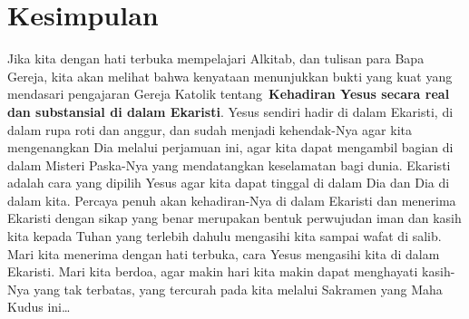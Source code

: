 \section[Kesimpulan]{Kesimpulan}
Jika kita dengan hati terbuka mempelajari Alkitab, dan tulisan para Bapa
Gereja, kita akan melihat bahwa kenyataan menunjukkan bukti yang kuat
yang mendasari pengajaran Gereja Katolik tentang~\textbf{Kehadiran
Yesus secara real dan substansial di dalam Ekaristi}. Yesus sendiri
hadir di dalam Ekaristi, di dalam rupa roti dan anggur, dan sudah
menjadi kehendak-Nya agar kita mengenangkan Dia melalui perjamuan ini,
agar kita dapat mengambil bagian di dalam Misteri Paska-Nya yang
mendatangkan keselamatan bagi dunia. Ekaristi adalah cara yang dipilih
Yesus agar kita dapat tinggal di dalam Dia dan Dia di dalam kita.
Percaya penuh akan kehadiran-Nya di dalam Ekaristi dan menerima
Ekaristi dengan sikap yang benar merupakan bentuk perwujudan iman dan
kasih kita kepada Tuhan yang terlebih dahulu mengasihi kita sampai
wafat di salib. Mari kita menerima dengan hati terbuka, cara Yesus
mengasihi kita di dalam Ekaristi. Mari kita berdoa, agar makin hari
kita makin dapat menghayati kasih-Nya yang tak terbatas, yang tercurah
pada kita melalui Sakramen yang Maha Kudus ini{\dots}

